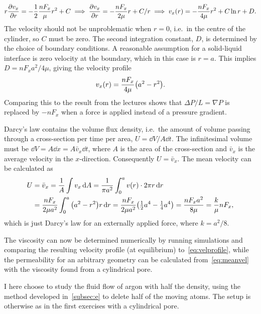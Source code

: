 \documentclass[11pt,british,a4paper]{report}
\begin{document}
\begin{equation}
    r\pdv{v_x}{r} = -\frac{1}{2}\frac{nF_x}{\mu}r^2 + C
    \implies \pdv{v_x}{r} = -\frac{nF_x}{2\mu}r + C/r
    \implies v_x(r) = -\frac{nF_x}{4\mu}r^2 + C\ln r + D.
\end{equation}
The velocity should not be unproblematic when \(r=0\), i.e.\ in the centre of the cylinder, so \(C\) must be zero. The second integration constant, \(D\), is determined by the choice of boundary conditions. A reasonable assumption for a solid-liquid interface is zero velocity at the boundary, which in this case is \(r=a\). This implies \(D=nF_xa^2/4\mu\), giving the velocity profile
\begin{equation}
    v_x(r) = \frac{nF_x}{4\mu}\qty(a^2-r^2).\label{eq:velprofile}
\end{equation}
Comparing this to the result from the lectures shows that \(\Delta P/L = \nabla P\) is replaced by \(-nF_x\) when a force is applied instead of a pressure gradient.

Darcy's law contains the volume flux density, i.e.\ the amount of volume passing through a cross-section per time per area, \(U=\dd{V}/A\dd{t}\). The infinitesimal volume must be \(\dd{V}=A\dd{x}=A\bar{v}_x\dd{t}\), where \(A\) is the area of the cross-section and \(\bar{v}_x\) is the average velocity in the \(x\)-direction. Consequently \(U=\bar{v}_x\). The mean velocity can be calculated as
\begin{alignat}{2}
    U &= \bar{v}_x = \frac{1}{A}\int v_x \dd{A} = \frac{1}{\pi a^2}\int_0^a v(r)\cdot 2\pi r\dd{r}\\
    &= \frac{nF_x}{2\mu a^2}\int_0^a \qty(a^2-r^2)r\dd{r}
    = \frac{nF_x}{2\mu a^2}\qty(\tfrac{1}{2}a^4-\tfrac{1}{4}a^4)
    = \frac{nF_xa^2}{8\mu} = \frac{k}{\mu} nF_x,\label{eq:meanvel}
\end{alignat}
which is just Darcy's law for an externally applied force, where \(k=a^2/8\).

The viscosity can now be determined numerically by running simulations and comparing the resulting velocity profile (at equilibrium) to~\vref{eq:velprofile}, while the permeability for an arbitrary geometry can be calculated from~\vref{eq:meanvel} with the viscosity found from a cylindrical pore.

I here choose to study the fluid flow of argon with half the density, using the method developed in~\vref{subsec:e} to delete half of the moving atoms. The setup is otherwise as in the first exercises with a cylindrical pore.
\end{document}
